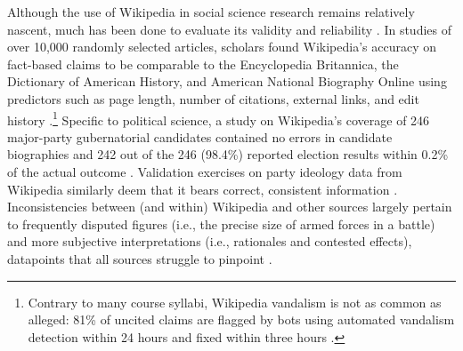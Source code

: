 \documentclass[fleqn,12pt]{article}
\begin{document}
Although the use of Wikipedia in social science research remains relatively nascent, much has been done to evaluate its validity and reliability \citep{greenstein_wikipediabiased_2012}. In studies of over 10,000 randomly selected articles, scholars found Wikipedia’s accuracy on fact-based claims to be comparable to the Encyclopedia Britannica, the Dictionary of American History, and American National Biography Online using predictors such as page length, number of citations, external links, and edit history \citep{rector_comparisonwikipediaother_2008}.\footnote{Contrary to many course syllabi, Wikipedia vandalism is not as common as alleged: 81\% of uncited claims are flagged by bots using automated vandalism detection within 24 hours and fixed within three hours \citep{tramullas_researchwikipediavandalism_2016}.} Specific to political science, a study on Wikipedia’s coverage of 246 major-party gubernatorial candidates contained no errors in candidate biographies and 242 out of the 246 (98.4\%) reported election results within 0.2\% of the actual outcome \citep{brown_wikipediadatasource_2011}. Validation exercises on party ideology data from Wikipedia similarly deem that it bears correct, consistent information \citep{herrmann_partypositionswikipedia_2021}. Inconsistencies between (and within) Wikipedia and other sources largely pertain to frequently disputed figures (i.e., the precise size of armed forces in a battle) and more subjective interpretations (i.e., rationales and contested effects), datapoints that all sources struggle to pinpoint \citep{oswald_clickclickboom_2022}.
\end{document}
